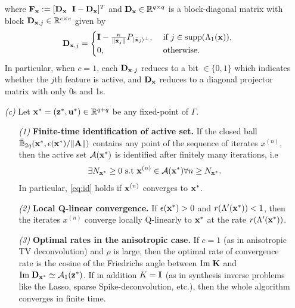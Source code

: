 \begin{theorem}
\begin{itemize}
where $\mathbf{F}_{\mathbf{x}} := [\mathbf{D}_{\mathbf{x}} \hspace{.6em} \mathbf{I} - \mathbf{D}_{\mathbf{x}}]^T$ and  $\mathbf{D}_{\mathbf{x}} \in
\mathbb{R}^{q \times q}$ is a block-diagonal matrix
with block $\mathbf{D}_{\mathbf{x},j} \in \mathbb{R}^{c \times c}$
given by
\begin{eqnarray}
\mathbf{D}_{\mathbf{x},j} = \begin{cases}\mathbf{I} -
  \frac{\kappa}{\|\tilde{\mathbf{x}}_j\|}P_{\langle
        \tilde{\mathbf{x}}_j \rangle^\perp}, &\mbox{ if } j \in
  \operatorname{supp}(\Lambda_1(\mathbf{x})),\\ 0, &\mbox{ otherwise.}\end{cases}
\label{eq:d}
\end{eqnarray}
In particular,  when $c=1$,  each $\mathbf{D}_{\mathbf{x}^,j}$ reduces to a
bit $\in \{0,1\}$ which indicates whether the $j$th feature is
active, and $\mathbf{D}_{\mathbf{x}}$ reduces to a diagonal projector matrix with only
0s and 1s.

\item[\textit{(c)}] Let $\mathbf{x}^* = (\mathbf{z}^*, \mathbf{u}^*)\in \mathbb{R}^{q+q}$ be any fixed-point of $\Gamma$.
\begin{itemize}
\item[\textit{(1)}] \textbf{Finite-time identification of
    active set.} If the closed ball $\bar{\mathbb{B}}_{2q}(\mathbf{x}^*, \epsilon(\mathbf{x}^*)/\|\mathbf{A}\|)$
    contains any point of the sequence of iterates $x^{(n)}$, then the
    active set $\mathcal{A}(\mathbf{x}^*)$ is
    identified after finitely many iterations, i.e
    \begin{eqnarray}
      \label{eq:id}
      \exists N_{\mathbf{x}^*} \ge 0 \text{ s.t }\mathbf{x}^{(n)} \in \mathcal{A}(\mathbf{x}^*)
      \forall n \ge N_{\mathbf{x}^*}.
    \end{eqnarray}
      In particular, \eqref{eq:id} holds if $\mathbf{x}^{(n)}$ converges to $\mathbf{x}^*$.

\item[\textit{(2)}] \textbf{Local Q-linear convergence.}
If $\epsilon(\mathbf{x}^*) > 0$ and $r(\Lambda'(\mathbf{x}^*)) < 1$, then the iterates
$x^{(n)}$ converge locally Q-linearly to $\mathbf{x}^*$
at the rate $r(\Lambda'(\mathbf{x}^*))$.

\label{thm:frechet}
\item[\textit{(3)}] \textbf{Optimal rates in the anisotropic case.}
If $c=1$ (as in anisotropic TV deconvolution) and $\rho$ is large, then the optimal rate of convergence
rate is the cosine of the Friedrichs angle between
$\mathrm{Im}\;\mathbf{K}$ and $\mathrm{Im}\;\mathbf{D}_{\mathbf{x}^*} \simeq \mathcal A_1(\mathbf{z}^*)$. If in addition
$K = \mathbf{I}$ (as in synthesis inverse problems like the Lasso, sparse  Spike-deconvolution, etc.), then
the whole algorithm converges in finite time.
\end{itemize}
\end{itemize}
\end{theorem}

